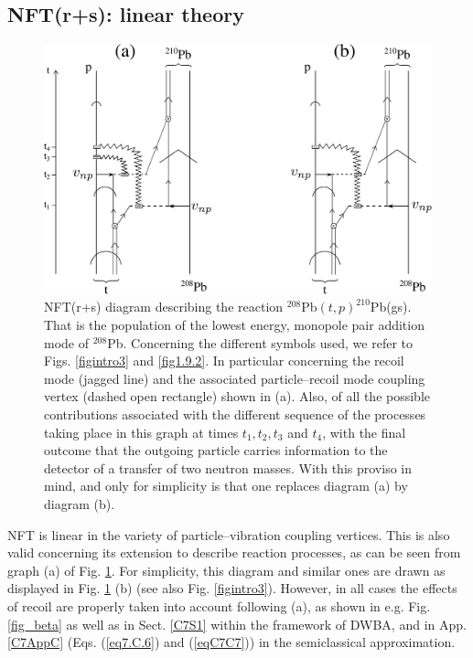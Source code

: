 \begin{subappendices}
\subsection{NFT(r+s): linear theory}\label{App1C3}
\begin{figure}
\centerline {
\includegraphics*[width=15cm]{introduccion/figs/fig1_C_2}
}
\caption{NFT(r+s) diagram describing the reaction $^{208}$Pb$(t,p)^{210}$Pb(gs). That is the population of the lowest energy, monopole pair addition mode of $^{208}$Pb. Concerning the different symbols used, we refer to Figs. \ref{figintro3} and \ref{fig1.9.2}. In particular concerning the recoil mode (jagged line) and the associated particle--recoil mode coupling vertex (dashed open rectangle) shown in (a). Also, of all the possible contributions associated with the different sequence of the processes taking place in this graph at times $t_1,t_2,t_3$ and $t_4$, with the final outcome that the outgoing particle carries information to the detector of a transfer of two neutron masses. With this proviso in mind, and only for simplicity is that one replaces diagram (a) by diagram (b).}
\label{fig1.C.2}
\end{figure}
NFT is linear in the variety of particle--vibration coupling vertices. This is also valid concerning its extension to describe reaction processes, as can be seen from graph (a) of Fig. \ref{fig1.C.2}. For simplicity, this diagram and similar ones are drawn as displayed in Fig. \ref{fig1.C.2} (b) (see also Fig. \ref{figintro3}). However, in all cases the effects of recoil are properly taken into account following (a), as shown in e.g. Fig. \ref{fig_beta} as well as in Sect. \ref{C7S1} within the framework of DWBA, and in App. \ref{C7AppC} (Eqs. (\ref{eq7.C.6}) and (\ref{eqC7C7})) in the semiclassical approximation.

\end{subappendices}
